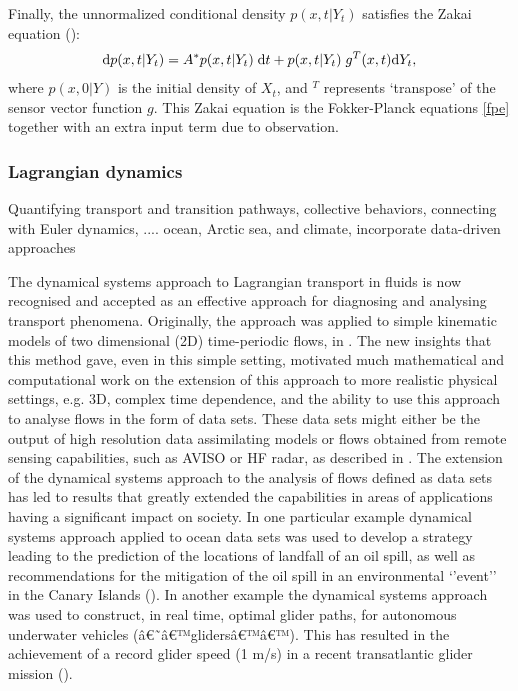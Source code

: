 \documentclass[11pt]{article}
\begin{document}
Finally, the unnormalized conditional   density
$p(x, t|Y_t)$ satisfies the  Zakai equation  (\cite{QiaoDuan, Popa, Miku}):
\begin{eqnarray} \label{Zakai}
{\rm d}p(x, t|Y_t) = A^*p(x, t|Y_t) \; {\rm d}t + p(x, t|Y_t)\; g^T(x, t) {\rm d}Y_t,
\end{eqnarray}
where $p(x, 0|Y)$ is the initial  density of $X_t$,  and $ ^T$ represents `transpose' of the sensor vector function $g$.  This Zakai equation is the Fokker-Planck equations \eqref{fpe} together with an extra input term due to observation.







\subsubsection{Lagrangian  dynamics}
Quantifying transport and transition pathways, collective behaviors, connecting with Euler dynamics, ....  ocean, Arctic sea, and climate, incorporate data-driven approaches




The dynamical systems approach to Lagrangian transport in fluids is now recognised and accepted as  an effective approach for diagnosing and analysing transport phenomena.   Originally, the approach was applied to simple kinematic models of two dimensional (2D) time-periodic flows, in \cite{aref1, ottbook, physrep}. The new insights that this method gave, even in this simple setting, motivated much mathematical and computational work on the extension of this approach to more realistic physical settings, e.g. 3D, complex time dependence, and the ability to use this approach to analyse flows in the form of data sets.
These data sets might either be the output of high resolution data assimilating models or flows obtained from remote sensing capabilities, such as AVISO or HF radar,  as described in \cite{prl, mmw14, victor17}.
The extension of the dynamical systems approach to the analysis of flows defined as data sets has led to  results that greatly extended the capabilities in areas of applications having a significant impact on society.
In one particular example dynamical systems approach applied to ocean data sets  was used to develop a  strategy  leading to the prediction of the locations of landfall of an oil spill, as well as recommendations for the mitigation of the oil spill in an environmental `'event''  in the Canary Islands (\cite{GRMCW15}).  In another example  the dynamical systems approach was used to  construct, in real time, optimal glider paths, for autonomous underwater  vehicles (â€˜â€™glidersâ€™â€™). This has resulted in the achievement of a record glider speed (1 m/s) in a recent transatlantic glider mission (\cite{ramos2018}).
\end{document}
